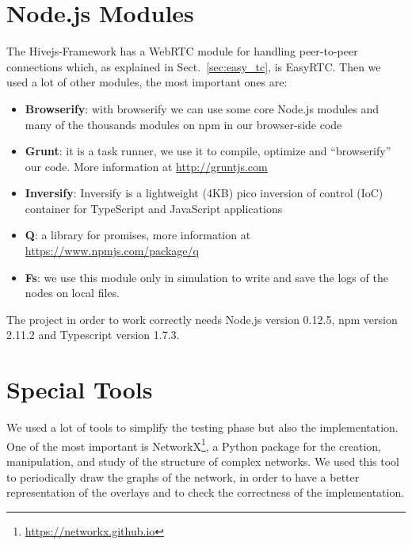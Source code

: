 \section{Node.js Modules}
\label{sec:modules}
The Hivejs-Framework has a WebRTC module for handling peer-to-peer connections which, as explained in Sect.~\ref{sec:easy_tc}, is EasyRTC. Then we used a lot of other modules, the most important ones are:

\begin{itemize}
	\item \textbf{Browserify}: with browserify we can use some core Node.js modules and many of the thousands modules on npm in our browser-side code
	\item \textbf{Grunt}: it is a task runner, we use it to compile, optimize and ``browserify'' our code. More information at \url{http://gruntjs.com}
	\item \textbf{Inversify}: Inversify is a lightweight (4KB) pico inversion of control (IoC) container for TypeScript and JavaScript applications
	\item \textbf{Q}: a library for promises, more information at \url{https://www.npmjs.com/package/q}
	\item \textbf{Fs}: we use this module only in simulation to write and save the logs of the nodes on local files.
\end{itemize}

The project in order to work correctly needs Node.js version 0.12.5, npm version 2.11.2 and Typescript version 1.7.3.

\section{Special Tools}
We used a lot of tools to simplify the testing phase but also the implementation. One of the most important is NetworkX\footnote{\url{https://networkx.github.io}}, a Python package for the creation, manipulation, and study of the structure of complex networks. We used this tool to periodically draw the graphs of the network, in order to have a better representation of the overlays and to check the correctness of the implementation. 


